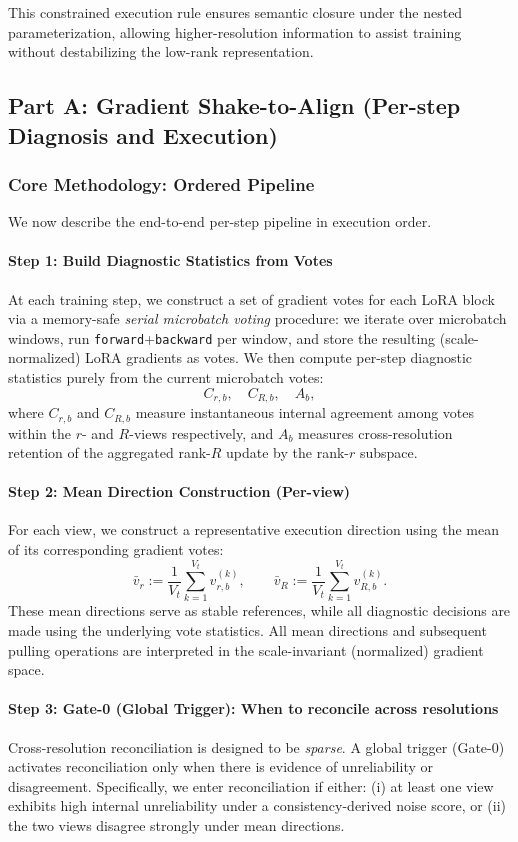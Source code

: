 \documentclass{article}
\begin{document}
This constrained execution rule ensures semantic closure
under the nested parameterization,
allowing higher-resolution information to assist training
without destabilizing the low-rank representation.

\subsection{Part A: Gradient Shake-to-Align (Per-step Diagnosis and Execution)}
\label{sec:partA}
\subsubsection{Core Methodology: Ordered Pipeline}
\label{sec:core-methodology}
We now describe the end-to-end per-step pipeline in execution order.

\paragraph{Step 1: Build Diagnostic Statistics from Votes}
At each training step, we construct a set of gradient votes for each LoRA block
via a memory-safe \emph{serial microbatch voting} procedure:
we iterate over microbatch windows, run \texttt{forward}+\texttt{backward} per window,
and store the resulting (scale-normalized) LoRA gradients as votes.
We then compute per-step diagnostic statistics purely from the current microbatch votes:
\[
C_{r,b},\quad C_{R,b},\quad A_b,
\]
where $C_{r,b}$ and $C_{R,b}$ measure instantaneous internal agreement among votes
within the $r$- and $R$-views respectively, and $A_b$ measures
cross-resolution retention of the aggregated rank-$R$ update by the rank-$r$ subspace.

\paragraph{Step 2: Mean Direction Construction (Per-view)}
For each view, we construct a representative execution direction
using the mean of its corresponding gradient votes:
\[
\bar v_r := \frac{1}{V_t}\sum_{k=1}^{V_t} v^{(k)}_{r,b},
\qquad
\bar v_R := \frac{1}{V_t}\sum_{k=1}^{V_t} v^{(k)}_{R,b}.
\]
These mean directions serve as stable references,
while all diagnostic decisions are made using the underlying vote statistics.
All mean directions and subsequent pulling operations are interpreted in the scale-invariant (normalized) gradient space.

\paragraph{Step 3: Gate-0 (Global Trigger): When to reconcile across resolutions}
Cross-resolution reconciliation is designed to be \emph{sparse}.
A global trigger (Gate-0) activates reconciliation only when
there is evidence of unreliability or disagreement.
Specifically, we enter reconciliation if either:
(i) at least one view exhibits high internal unreliability under a consistency-derived noise score, or
(ii) the two views disagree strongly under mean directions.
\end{document}
